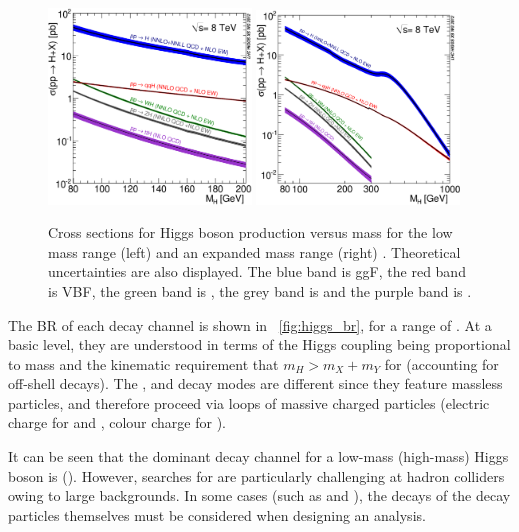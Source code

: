 \begin{figure}
	\includegraphics[width=0.48\textwidth]{tex/motivation/xs_lowrange}
	\hfill
	\includegraphics[width=0.48\textwidth]{tex/motivation/xs_fullrange}
	\caption{Cross sections for Higgs boson production versus mass for the low mass range (left) and an expanded mass range (right) \cite{YR2}. Theoretical uncertainties are also displayed. The blue band is \ac{ggF}, the red band is \ac{VBF}, the green band is \WH, the grey band is \ZH and the purple band is \ttH.}
	\label{fig:higgs_xs}
\end{figure}

The \ac{BR} of each decay channel is shown in \Figure~\ref{fig:higgs_br}, for a range of 
\mH. At a basic level, they are understood in terms of the Higgs coupling being 
proportional to mass and the kinematic requirement that $m_H > m_X + m_Y$ for 
 (accounting for off-shell decays).
The \HepProcess{\Pphoton \Pphoton}, \HepProcess{\PZ \Pphoton} and 
\HepProcess{\Pgluon \Pgluon} decay modes are different since they feature massless 
particles, and therefore proceed via loops of massive charged particles (electric charge 
for \HepProcess{\Pphoton \Pphoton} and \HepProcess{\PZ \Pphoton}, colour charge for 
\HepProcess{\Pgluon \Pgluon}).

It can be seen that the dominant decay channel for a low-mass (high-mass) Higgs boson is 
\HepProcess{\Pbottom \APbottom} (\WW). However, searches for 
\HepProcess{\PHiggs \HepTo \Pbottom \APbottom} are particularly challenging at hadron 
colliders owing to large backgrounds. In some cases (such as \WW and \ZZ), the decays of 
the decay particles themselves must be considered when designing an analysis.


